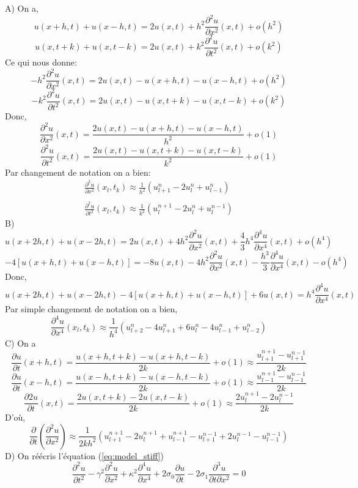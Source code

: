 \documentclass[a4,12pt]{article}
\begin{document}
\newpage

\begin{mdframed}[style=exempledefault,backgroundcolor=green!60]
    A)
On a,
\[
    u(x+h,t)+u(x-h,t)=2u(x,t)+h^2\frac{\partial^2 u}{\partial x^2}(x,t)+o(h^2)
\]
\[
    u(x,t+k)+u(x,t-k)=2u(x,t)+k^2\frac{\partial^2 u}{\partial t^2}(x,t)+o(k^2)
\]
Ce qui nous donne:
\[
    -h^2\frac{\partial^2 u}{\partial x^2}(x,t)=2u(x,t)-u(x+h,t)-u(x-h,t)+o(h^2)
\]
\[
    -k^2\frac{\partial^2 u}{\partial t^2}(x,t)=2u(x,t)-u(x,t+k)-u(x,t-k)+o(k^2)
\]
Donc,
\[
    \frac{\partial^2 u}{\partial x^2}(x,t)=\frac{2u(x,t)-u(x+h,t)-u(x-h,t)}{h^2}+o(1)
\]
\[
    \frac{\partial^2 u}{\partial t^2}(x,t)=\frac{2u(x,t)-u(x,t+k)-u(x,t-k)}{k^2}+o(1)
\]
Par changement de notation on a bien:
\[
\begin{array}{l}
	\displaystyle \frac{\partial^2 u}{\partial x^2}(x_l,t_k)\approx \frac{1}{h^2}(u_{l+1}^n-2u_l^n+u_{l-1}^n)\\ \\ 		\displaystyle \frac{\partial^2 u}{\partial t^2}(x_l,t_k)\approx \frac{1}{k^2}(u_{l}^{n+1}-2u_l^n+u_{l}^{n-1})\end{array}
\]
    B)
\[
    u(x+2h,t)+u(x-2h,t)=2u(x,t)+4h^2\frac{\partial ^2u}{\partial x^2}(x,t)+\frac{4}{3}h^4\frac{\partial ^4u}{\partial x^4}(x,t)+o(h^4)
\]
\[
    -4[u(x+h,t)+u(x-h,t)]=-8u(x,t)-4h^2\frac{\partial ^2u}{\partial x^2}(x,t)-\frac{h^3}{3}\frac{\partial ^4u}{\partial x^4}(x,t)-o(h^4)
\]
Donc,
\[
    u(x+2h,t)+u(x-2h,t)-4[u(x+h,t)+u(x-h,t)]+6u(x,t)=h^4\frac{\partial ^4u}{\partial x^4}(x,t)
\]
Par simple changement de notation on a bien,
\[
\frac{\partial^4 u}{\partial x^4}(x_l,t_k)\approx \frac{1}{h^4}(u_{l+2}^n-4u_{l+1}^n+6u_l^n-4u_{l-1}^n+u_{l-2}^n)
\]
    C) On a
\[
    \frac{\partial u}{\partial t}(x+h,t)=\frac{u(x+h,t+k)-u(x+h,t-k)}{2k}+o(1)\approx \frac{u_{l+1}^{n+1}-u_{l+1}^{n-1}}{2k}
\]
\[
    \frac{\partial u}{\partial t}(x-h,t)=\frac{u(x-h,t+k)-u(x-h,t-k)}{2k}+o(1)\approx \frac{u_{l-1}^{n+1}-u_{l-1}^{n-1}}{2k}
\]
\[
    \frac{\partial 2u}{\partial t}(x,t)=\frac{2u(x,t+k)-2u(x,t-k)}{2k}+o(1) \approx \frac{2u_{l}^{n+1}-2u_{l}^{n-1}}{2k}
\]
D'où,
\[
\frac{\partial}{\partial t}\left(\frac{\partial^2 u}{\partial x^2}\right)\approx \frac{1}{2kh^2}(u_{l+1}^{n+1}-2u_{l}^{n+1}+u_{l-1}^{n+1}-u_{l+1}^{n-1}+2u_l^{n-1}-u_{l-1}^{n-1})
\]
    D) On réécris l'équation (\ref{eq:model_stiff})
\[
    \frac{\partial^2 u}{\partial t^2}-\gamma^2 \frac{\partial^2 u}{\partial x^2}+\kappa^2 \frac{\partial^4 u}{\partial x^4}+2\sigma_0 \frac{\partial u}{\partial t}-2\sigma_1 \frac{\partial^3 u}{\partial t\partial x^2}=0
\]
\end{mdframed}
\end{document}

